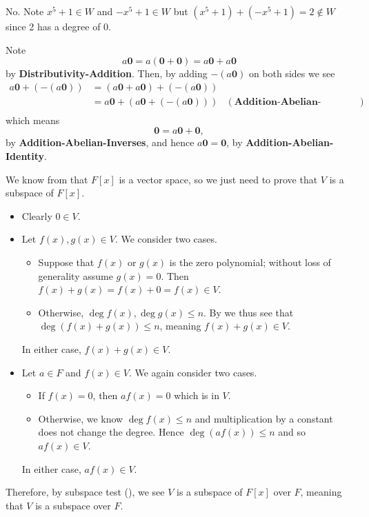 \begin{questions}
    \item No. Note $x^5 + 1 \in W$ and $-x^5 + 1 \in W$ but $(x^5+1) + (-x^5+1) = 2 \notin W$ since 2 has a degree of 0.
    
    \item Note
    \[
        a\textbf{0} = a(\textbf{0} + \textbf{0}) = a\textbf{0} + a\textbf{0}
    \]
    by \textbf{Distributivity-Addition}. Then, by adding $-(a\textbf{0})$ on both sides we see
    \begin{align*}
        a\textbf{0} + (-(a\textbf{0})) &= (a\textbf{0} + a\textbf{0}) + (-(a\textbf{0}))\\
        &= a\textbf{0} + (a\textbf{0} + (-(a\textbf{0}))) & (\textbf{Addition-Abelian-Associativity})\\
    \end{align*}
    which means
    \[
        \textbf{0} = a\textbf{0} + \textbf{0},
    \]
    by \textbf{Addition-Abelian-Inverses}, and hence $a\textbf{0} = \textbf{0}$, by \textbf{Addition-Abelian-Identity}.

    \item We know from  that $F[x]$ is a vector space, so we just need to prove that $V$ is a subspace of $F[x]$.
    \begin{itemize}
        \item Clearly $0 \in V$.
        \item Let $f(x), g(x) \in V$. We consider two cases.
        \begin{itemize}
            \item Suppose that $f(x)$ or $g(x)$ is the zero polynomial; without loss of generality assume $g(x) = 0$. Then $f(x) + g(x) = f(x) + 0 = f(x) \in V$.
            \item Otherwise, $\deg f(x), \deg g(x) \leq n$. By  we thus see that $\deg (f(x) + g(x)) \leq n$, meaning $f(x) + g(x) \in V$.
        \end{itemize}
        In either case, $f(x) + g(x) \in V$.
        \item Let $a \in F$ and $f(x) \in V$. We again consider two cases.
        \begin{itemize}
            \item If $f(x) = 0$, then $af(x) = 0$ which is in $V$.
            \item Otherwise, we know $\deg f(x) \leq n$ and multiplication by a constant does not change the degree. Hence $\deg (af(x)) \leq n$ and so $af(x) \in V$.
        \end{itemize}
        In either case, $af(x) \in V$.
    \end{itemize}
    Therefore, by subspace test (), we see $V$ is a subspace of $F[x]$ over $F$, meaning that $V$ is a subspace over $F$.
\end{questions}
